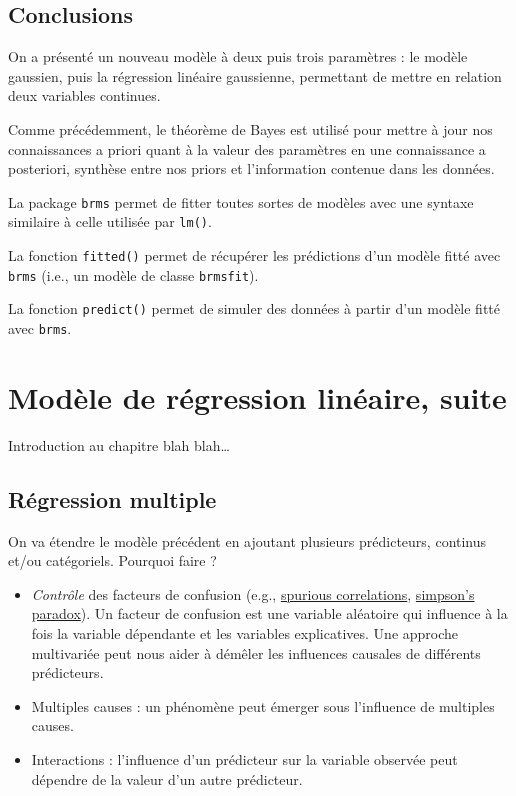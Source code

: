 \documentclass[
  a4paper,11pt,twoside,onecolumn,openright,final,oldfontcommands]{memoir}
\theoremstyle{definition}
\theoremstyle{definition}
\theoremstyle{definition}
\theoremstyle{definition}
\theoremstyle{remark}
\begin{document}
\hypertarget{conclusions-1}{%
\section{Conclusions}\label{conclusions-1}}

On a présenté un nouveau modèle à deux puis trois paramètres : le modèle gaussien, puis la régression linéaire gaussienne, permettant de mettre en relation deux variables continues.

Comme précédemment, le théorème de Bayes est utilisé pour mettre à jour nos connaissances a priori quant à la valeur des paramètres en une connaissance a posteriori, synthèse entre nos priors et l'information contenue dans les données.

La package \texttt{brms} permet de fitter toutes sortes de modèles avec une syntaxe similaire à celle utilisée par \texttt{lm()}.

La fonction \texttt{fitted()} permet de récupérer les prédictions d'un modèle fitté avec \texttt{brms} (i.e., un modèle de classe \texttt{brmsfit}).

La fonction \texttt{predict()} permet de simuler des données à partir d'un modèle fitté avec \texttt{brms}.

\hypertarget{linear-regression2}{%
\chapter{Modèle de régression linéaire, suite}\label{linear-regression2}}


Introduction au chapitre blah blah\ldots{}

\hypertarget{ruxe9gression-multiple}{%
\section{Régression multiple}\label{ruxe9gression-multiple}}

On va étendre le modèle précédent en ajoutant plusieurs prédicteurs, continus et/ou catégoriels. Pourquoi faire ?

\begin{itemize}
\item
  \emph{Contrôle} des facteurs de confusion (e.g., \href{http://www.tylervigen.com/spurious-correlations}{spurious correlations}, \href{https://en.wikipedia.org/wiki/Simpson\%27s_paradox}{simpson's paradox}). Un facteur de confusion est une variable aléatoire qui influence à la fois la variable dépendante et les variables explicatives. Une approche multivariée peut nous aider à démêler les influences causales de différents prédicteurs.
\item
  Multiples causes : un phénomène peut émerger sous l'influence de multiples causes.
\item
  Interactions : l'influence d'un prédicteur sur la variable observée peut dépendre de la valeur d'un autre prédicteur.
\end{itemize}
\end{document}

